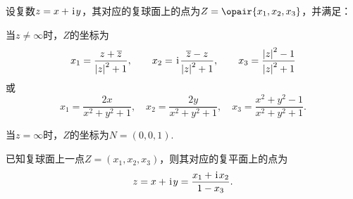 \begin{theorem}
设复数\(z = x + \kern1pt\mathrm{i}\kern1pt y\)，其对应的复球面上的点为\(Z=\opair{x_1,x_2,x_3}\)，并满足：

当\(z \neq \infty\)时，\(Z\)的坐标为\begin{equation*}
	x_1 = \frac{z + \overline{z}}{\abs{z}^2 + 1}, \qquad
	x_2 = \kern1pt\mathrm{i}\kern1pt \frac{\overline{z} - z}{\abs{z}^2 + 1}, \qquad
	x_3 = \frac{\abs{z}^2 - 1}{\abs{z}^2 + 1}
\end{equation*}
或\begin{equation*}
	x_1 = \frac{2x}{x^2+y^2+1}, \quad
	x_2 = \frac{2y}{x^2+y^2+1}, \quad
	x_3 = \frac{x^2+y^2-1}{x^2+y^2+1}.
\end{equation*}

当\(z = \infty\)时，\(Z\)的坐标为\(N = (0,0,1)\).
\end{theorem}

\begin{theorem}
已知复球面上一点\(Z=(x_1,x_2,x_3)\)，则其对应的复平面上的点为\begin{equation*}
	z = x + \kern1pt\mathrm{i}\kern1pt y
	= \frac{x_1+\kern1pt\mathrm{i}\kern1pt x_2}{1-x_3}.
\end{equation*}
\end{theorem}
